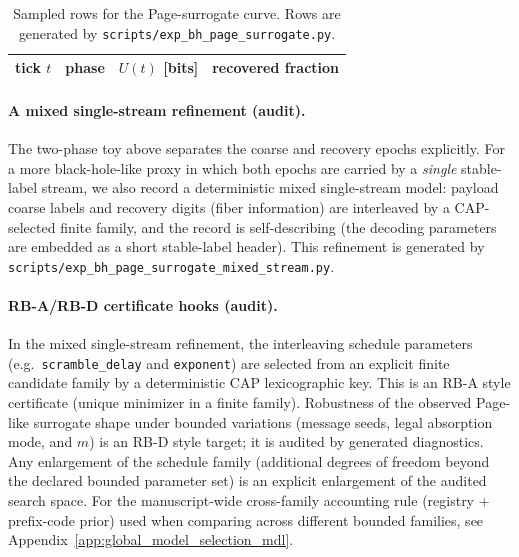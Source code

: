 \begin{table}[t]
\centering
\scriptsize
\setlength{\tabcolsep}{6pt}
\renewcommand{\arraystretch}{1.15}
\begin{tabular}{r l r r}
\toprule
tick $t$ & phase & $U(t)$ [bits] & recovered fraction \\
\midrule
%
\end{tabular}
\caption{Sampled rows for the Page-surrogate curve. Rows are generated by
\texttt{scripts/exp\_bh\_page\_surrogate.py}.}
\label{tab:bh_page_surrogate_rows}
\end{table}

\paragraph{A mixed single-stream refinement (audit).}
\AuditTag The two-phase toy above separates the coarse and recovery epochs explicitly.
For a more black-hole-like proxy in which both epochs are carried by a \emph{single} stable-label stream,
we also record a deterministic mixed single-stream model:
payload coarse labels and recovery digits (fiber information) are interleaved by a CAP-selected finite family,
and the record is self-describing (the decoding parameters are embedded as a short stable-label header).
This refinement is generated by \texttt{scripts/exp\_bh\_page\_surrogate\_mixed\_stream.py}.

\paragraph{RB-A/RB-D certificate hooks (audit).}
\AuditTag In the mixed single-stream refinement, the interleaving schedule parameters (e.g.\ \texttt{scramble\_delay} and
\texttt{exponent}) are selected from an explicit finite candidate family by a deterministic CAP lexicographic key.
This is an RB-A style certificate (unique minimizer in a finite family).
Robustness of the observed Page-like surrogate shape under bounded variations (message seeds, legal absorption mode, and $m$)
is an RB-D style target; it is audited by generated diagnostics.
\AuditTag Any enlargement of the schedule family (additional degrees of freedom beyond the declared bounded parameter set) is an explicit enlargement of the audited search space.
For the manuscript-wide cross-family accounting rule (registry + prefix-code prior) used when comparing across different bounded families, see Appendix~\ref{app:global_model_selection_mdl}.

